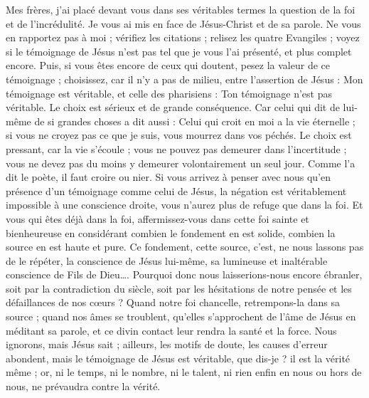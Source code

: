 Mes frères, j’ai placé devant vous dans ses véritables termes la question de la foi et de l’incrédulité. Je vous ai mis en face de Jésus-Christ et de sa parole. Ne vous en rapportez pas à moi ; vérifiez les citations ; relisez les quatre Evangiles ; voyez si le témoignage de Jésus n’est pas tel que je vous l’ai présenté, et plus complet encore. Puis, si vous êtes encore de ceux qui doutent, pesez la valeur de ce témoignage ; choisissez, car il n’y a pas de milieu, entre l’assertion de Jésus : \Og{} Mon témoignage est véritable\Fg{}, et celle des pharisiens : \Og{} Ton témoignage n’est pas véritable.\Fg{} Le choix est sérieux et de grande conséquence. Car celui qui dit de lui-même de si grandes choses a dit aussi : \Og{} Celui qui croit en moi a la vie éternelle ; si vous ne croyez pas ce que je suis, vous mourrez dans vos péchés.\Fg{} Le choix est pressant, car la vie s’écoule ; vous ne pouvez pas demeurer dans l’incertitude ; vous ne devez pas du moins y demeurer volontairement un seul jour. Comme l’a dit le poète, il faut croire ou nier. Si vous arrivez à penser avec nous qu’en présence d’un témoignage comme celui de Jésus, la négation est véritablement impossible à une conscience droite, vous n’aurez plus de refuge que dans la foi. Et vous qui êtes déjà dans la foi, affermissez-vous dans cette foi sainte et bienheureuse en considérant combien le fondement en est solide, combien la source en est haute et pure. Ce fondement, cette source, c’est, ne nous lassons pas de le répéter, la conscience de Jésus lui-même, sa lumineuse et inaltérable conscience de Fils de Dieu…. Pourquoi donc nous laisserions-nous encore ébranler, soit par la contradiction du siècle, soit par les hésitations de notre pensée et les défaillances de nos cœurs ? Quand notre foi chancelle, retrempons-la dans sa source ; quand nos âmes se troublent, qu’elles s’approchent de l’âme de Jésus en méditant sa parole, et ce divin contact leur rendra la santé et la force. Nous ignorons, mais Jésus sait ; ailleurs, les motifs de doute, les causes d’erreur abondent, mais le témoignage de Jésus est véritable, que dis-je ? il est la vérité même ; or, ni le temps, ni le nombre, ni le talent, ni rien enfin en nous ou hors de nous, ne prévaudra contre la vérité.


